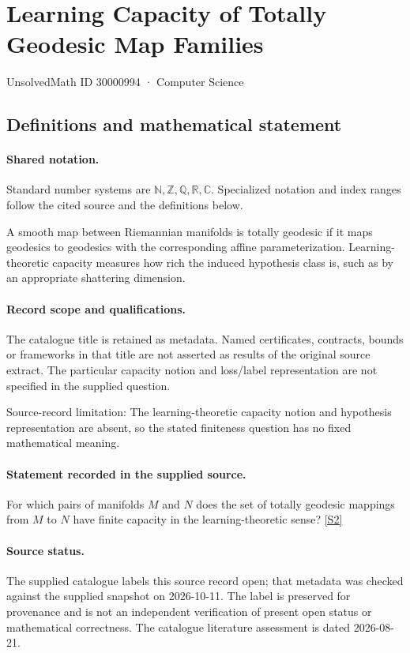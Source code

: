 \documentclass[11pt]{article}
\newcommand{\sref}[2]{\hyperlink{source:#1:#2}{[S#2]}}
\begin{document}
\setcounter{section}{30000993}
\section{Learning Capacity of Totally Geodesic Map Families}\label{30000994}
{\small\sffamily UnsolvedMath ID 30000994 · Computer Science}
\subsection{Definitions and mathematical statement}

\paragraph{Shared notation.}Standard number systems are $\mathbb N,\mathbb Z,\mathbb Q,\mathbb R,\mathbb C$. Specialized notation and index ranges follow the cited source and the definitions below.


A smooth map between Riemannian manifolds is totally geodesic if it maps geodesics to geodesics with the corresponding affine parameterization. Learning-theoretic capacity measures how rich the induced hypothesis class is, such as by an appropriate shattering dimension.
\paragraph{Record scope and qualifications.}
The catalogue title is retained as metadata. Named certificates, contracts, bounds or frameworks in that title are not asserted as results of the original source extract.
The particular capacity notion and loss/label representation are not specified in the supplied question.

Source-record limitation: The learning-theoretic capacity notion and hypothesis representation are absent, so the stated finiteness question has no fixed mathematical meaning.
\paragraph{Statement recorded in the supplied source.}
For which pairs of manifolds $M$ and $N$ does the set of totally geodesic mappings from $M$ to $N$ have finite capacity in the learning-theoretic sense? \sref{30000994}{2}
\paragraph{Source status.}
The supplied catalogue labels this source record open; that metadata was checked against the supplied snapshot on 2026-10-11. The label is preserved for provenance and is not an independent verification of present open status or mathematical correctness. The catalogue literature assessment is dated 2026-08-21.
\end{document}
